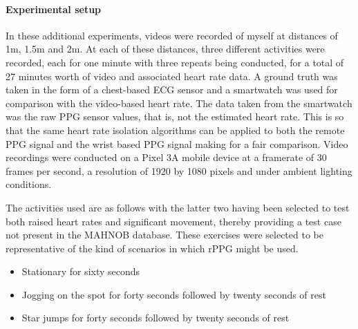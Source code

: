 
\paragraph{Experimental setup}
In these additional experiments, videos were recorded of myself at distances of 1m, 1.5m and 2m. 
At each of these distances, three different activities were recorded, each for one minute with three repeats being conducted, for a total of 27 minutes worth of video and associated heart rate data.
A ground truth was taken in the form of a chest-based ECG sensor and a smartwatch was used for comparison with the video-based heart rate.
The data taken from the smartwatch was the raw PPG sensor values, that is, not the estimated heart rate. This is so that the same heart rate isolation algorithms can be applied to both the 
remote PPG signal and the wrist based PPG signal making for a fair comparison.
Video recordings were conducted on a Pixel 3A mobile device at a framerate of 30 frames per second, a resolution of 1920 by 1080 pixels and under ambient lighting conditions.

The activities used are as follows with the latter two having been selected to test both raised heart rates and significant movement, thereby providing a test case not present in the MAHNOB database.
These exercises were selected to be representative of the kind of scenarios in which rPPG might be used.
\begin{itemize}
   \item Stationary for sixty seconds
   \item Jogging on the spot for forty seconds followed by twenty seconds of rest
   \item Star jumps for forty seconds followed by twenty seconds of rest
\end{itemize}


